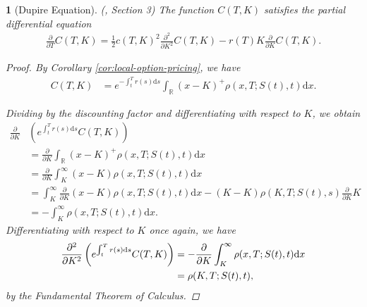 \documentclass[english]{article}
\numberwithin{equation}{section}
\numberwithin{figure}{section}
\theoremstyle{bolddescit}
\newtheorem{theorem}{\protect\theoremname}[section]
\theoremstyle{definition}
\theoremstyle{definition}
\theoremstyle{plain}
\theoremstyle{plain}
\theoremstyle{bolddesc}
\theoremstyle{plain}
\theoremstyle{remark}
\providecommand{\theoremname}{Theorem}
\begin{document}
\begin{theorem}[Dupire Equation]\label{thm:dupire}
  (\cite{dupire_pricing_1993}, Section 3)
  The function $C(T,K)$ satisfies the partial differential equation
  \begin{align*}
    \frac{\partial}{\partial T}C(T,K) = \frac{1}{2} c(T,K)^2 \frac{\partial^2}{\partial K^2} C(T,K) - r(T) K \frac{\partial}{\partial K}C(T,K).
  \end{align*}

  \begin{proof}
    By Corollary \ref{cor:local-option-pricing}, we have
    \begin{align*}
      C(T,K) &= e^{-\int_t^T r(s) \mathrm{d}s} \int_{\mathbb{R}} \left(x - K\right)^+ \rho(x,T;S(t),t) \mathrm{d}x.
    \end{align*}

    Dividing by the discounting factor and differentiating with respect to $K$, we obtain
    \begin{align*}
      \frac{\partial}{\partial K}&\left(e^{\int_t^T r(s) \mathrm{d}s} C(T,K)\right)\\
      &= \frac{\partial}{\partial K} \int_{\mathbb{R}} \left(x - K\right)^+ \rho(x,T;S(t),t) \mathrm{d}x\\
      &= \frac{\partial}{\partial K} \int_K^\infty \left(x - K\right) \rho(x,T;S(t),t) \mathrm{d}x\\
      &= \int_K^\infty \frac{\partial}{\partial K} \left(x - K\right) \rho(x,T;S(t),t) \mathrm{d}x - (K-K) \rho(K,T;S(t),s) \frac{\partial}{\partial K} K \tag{Leibniz Integral Rule}\\
      &= - \int_K^\infty \rho(x,T;S(t),t) \mathrm{d}x.
    \end{align*}
    Differentiating with respect to $K$ once again, we have
    \begin{align}
      \frac{\partial^2}{\partial K^2}\left(e^{\int_t^T r(s) \mathrm{d}s} C(T,K)\right)
      &= - \frac{\partial}{\partial K}\int_K^\infty \rho(x,T;S(t),t) \mathrm{d}x\notag\\
      &= \rho(K,T;S(t),t),\label{eq:dupire-rho}
    \end{align}
    by the Fundamental Theorem of Calculus.


\end{proof}
\end{theorem}
\end{document}
